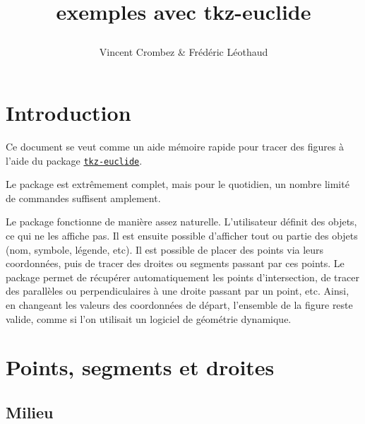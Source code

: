 \documentclass[fiche]{classe-tex3R}
\title{\bfseries exemples avec tkz-euclide\par}
\author{Vincent Crombez \& Frédéric Léothaud}
\date{}
\begin{document}
\maketitle

\newpage

\tableofcontents

\newpage

{}
\section*{Introduction}

Ce document se veut comme un aide mémoire rapide pour tracer des figures à l'aide du package \href{https://texlive.mycozy.space/macros/latex/contrib/tkz/tkz-euclide/doc/tkz-euclide.pdf}{\texttt{tkz-euclide}}.

Le package est extrêmement complet, mais pour le quotidien, un nombre limité de commandes suffisent amplement.

Le package fonctionne de manière assez naturelle. L'utilisateur définit des objets, ce qui ne les affiche pas. Il est ensuite possible d'afficher tout ou partie des objets (nom, symbole, légende, etc). Il est possible de placer des points via leurs coordonnées, puis de tracer des droites ou segments passant par ces points. Le package permet de récupérer automatiquement les points d'intersection, de tracer des parallèles ou perpendiculaires à une droite passant par un point, etc. Ainsi, en changeant les valeurs des coordonnées de départ, l'ensemble de la figure reste valide, comme si l'on utilisait un logiciel de géométrie dynamique.


\section{Points, segments et droites}

\subsection{Milieu}

  \hfill%
\end{document}
